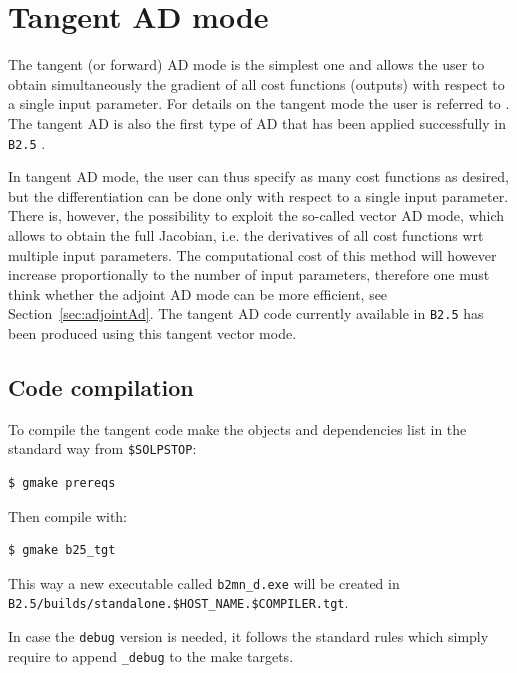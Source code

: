 \section{Tangent AD mode}\label{sec:forwardAD}

The tangent (or forward) AD mode is the simplest one and allows the user to obtain simultaneously the gradient of all cost functions (outputs) with respect to a single input parameter. For details on the tangent mode the user is referred to \cite{griewank}. The tangent AD is also the first type of AD that has been applied successfully in {\tt B2.5} \cite{carlipsi}.

In tangent AD mode, the user can thus specify as many cost functions as desired, but the differentiation can be done only with respect to a single input parameter. There is, however, the possibility to exploit the so-called vector AD mode, which allows to obtain the full Jacobian, i.e. the derivatives of all cost functions wrt multiple input parameters. The computational cost of this method will however increase proportionally to the number of input parameters, therefore one must think whether the adjoint AD mode can be more efficient, see Section~\ref{sec:adjointAd}. The tangent AD code currently available in {\tt B2.5} has been produced using this tangent vector mode.

\subsection{Code compilation}

To compile the tangent code make the objects and dependencies list in the standard way from {\tt \$SOLPSTOP}:
\begin{verbatim}
$ gmake prereqs
\end{verbatim}
Then compile with:
\begin{verbatim}
$ gmake b25_tgt
\end{verbatim}
This way a new executable called {\tt b2mn\_d.exe} will be created in {\tt B2.5/builds/standalone.\${HOST\_NAME}.\allowbreak\${COMPILER}.tgt}.

In case the {\tt debug} version is needed, it follows the standard \SOLPSITER rules which simply require to append {\tt \_debug} to the make targets.

